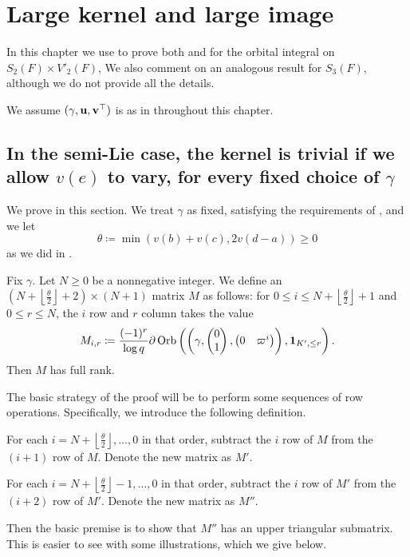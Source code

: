 \chapter{Large kernel and large image}
\label{ch:ker}

In this chapter we use  to prove
both  and 
for the orbital integral on $S_2(F) \times V'_2(F)$,
We also comment on an analogous result for $S_3(F)$,
although we do not provide all the details.

We assume ${(\gamma, \mathbf u, \mathbf v^\top)}$ is as in  throughout this chapter.

\section{In the semi-Lie case, the kernel is trivial if we allow $v(e)$ to vary, for every fixed choice of $\gamma$}
We prove  in this section.
We treat $\gamma$ as fixed, satisfying the requirements of ,
and we let
\[ \theta \coloneqq \min\left( v(b)+v(c), 2v(d-a) \right) \ge 0 \]
as we did in .

\begin{lemma}
  \label{lem:semi_lie_ker_full_rank}
  Fix $\gamma$. Let $N \ge 0$ be a nonnegative integer.
  We define an $(N+ \left\lfloor \frac{\theta}{2} \right\rfloor + 2) \times (N+1)$ matrix $M$ as follows:
  for $0 \le i \le N+ \left\lfloor \frac{\theta}{2} \right\rfloor + 1$ and $0 \le r \le N$,
  the $i$ row and $r$ column takes the value
  \[
    M_{i,r} \coloneqq \frac{(-1)^r}{\log q} \partial \operatorname{Orb}\left(
      \left(\gamma, \begin{pmatrix} 0 \\ 1 \end{pmatrix}, \begin{pmatrix} 0 & \varpi^i \end{pmatrix} \right),
      \mathbf{1}_{K', \le r} \right).
  \]
  Then $M$ has full rank.
\end{lemma}
The basic strategy of the proof will be to perform some sequences of row operations.
Specifically, we introduce the following definition.
\begin{itemize}
  \ii For each $i = N + \left\lfloor \frac{\theta}{2} \right\rfloor,\dots,0$ in that order,
  subtract the $i$ row of $M$
  from the $(i+1)$ row of $M$.
  Denote the new matrix as $M'$.

  \ii For each $i = N + \left\lfloor \frac{\theta}{2} \right\rfloor - 1,\dots,0$ in that order,
  subtract the $i$ row of $M'$
  from the $(i+2)$ row of $M'$.
  Denote the new matrix as $M''$.
\end{itemize}
Then the basic premise is to show that $M''$ has an upper triangular submatrix.
This is easier to see with some illustrations, which we give below.

